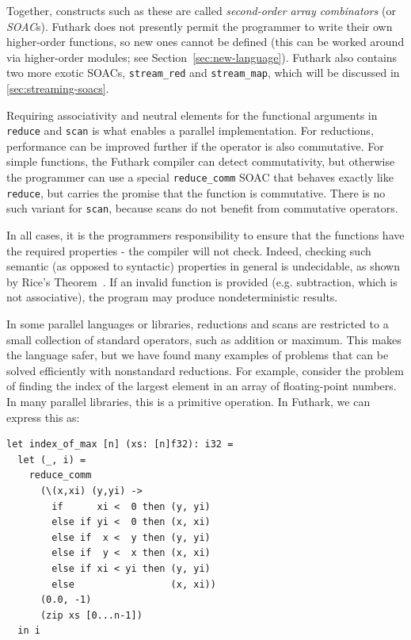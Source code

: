 Together, constructs such as these are called \textit{second-order
  array combinators} (or \textit{SOAC}s).  Futhark does not presently
permit the programmer to write their own higher-order functions, so
new ones cannot be defined (this can be worked around via higher-order
modules; see Section~\ref{sec:new-language}).  Futhark also contains
two more exotic SOACs, \lstinline{stream_red} and
\lstinline{stream_map}, which will be discussed in
\cref{sec:streaming-soacs}.

Requiring associativity and neutral elements for the functional
arguments in \lstinline{reduce} and \lstinline{scan} is what enables a
parallel implementation.  For reductions, performance can be improved
further if the operator is also commutative.  For
simple functions, the Futhark compiler can detect commutativity, but
otherwise the programmer can use a special \lstinline{reduce_comm}
SOAC that behaves exactly like \lstinline{reduce}, but carries the
promise that the function is commutative.  There is no such variant
for \lstinline{scan}, because scans do not benefit from commutative
operators.

In all cases, it is the programmers responsibility to ensure that the
functions have the required properties - the compiler will not check.
Indeed, checking such semantic (as opposed to syntactic) properties in
general is undecidable, as shown by Rice's
Theorem~\cite{10.2307/1990888}.  If an invalid function is provided
(e.g. subtraction, which is not associative), the program may produce
nondeterministic results.

In some parallel languages or libraries, reductions and scans are
restricted to a small collection of standard operators, such as
addition or maximum.  This makes the language safer, but we have found
many examples of problems that can be solved efficiently with
nonstandard reductions.  For example, consider the problem of finding
the index of the largest element in an array of floating-point
numbers.  In many parallel libraries, this is a primitive operation.
In Futhark, we can express this as:

\begin{lstlisting}
let index_of_max [n] (xs: [n]f32): i32 =
  let (_, i) =
    reduce_comm
      (\(x,xi) (y,yi) ->
        if      xi <  0 then (y, yi)
        else if yi <  0 then (x, xi)
        else if  x <  y then (y, yi)
        else if  y <  x then (x, xi)
        else if xi < yi then (y, yi)
        else                 (x, xi))
      (0.0, -1)
      (zip xs [0...n-1])
  in i
\end{lstlisting}


